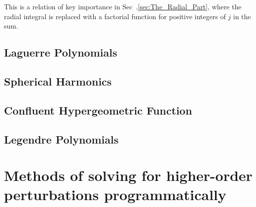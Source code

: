         This is a relation of key importance in Sec~.\ref{sec:The_Radial_Part}, where the radial integral is replaced with a factorial function for positive integers of $j$ in the sum.




    \section{Laguerre Polynomials} \label{sec:Laguerre_Polynomial}
    \section{Spherical Harmonics} \label{sec:Spherical_Harmonics}
    \section{Confluent Hypergeometric Function} \label{sec:Confluent_Hypergeometric_Function}
    \section{Legendre Polynomials} \label{sec:Legendre_Polynomial}
\chapter{Methods of solving for higher-order perturbations programmatically} \label{sec:Program_perturbation}